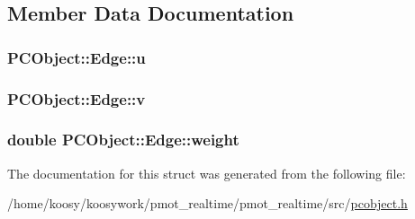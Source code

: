 \subsection{\-Member \-Data \-Documentation}
\hypertarget{struct_p_c_object_1_1_edge_af4067d329722069784adbc2e4df9fc73}{
\subsubsection[{u}]{ {\bf \-P\-C\-Object\-::\-Edge\-::u}}}\label{struct_p_c_object_1_1_edge_af4067d329722069784adbc2e4df9fc73}
\hypertarget{struct_p_c_object_1_1_edge_aaf9714de2de62884dfb6b682f54896f9}{
\subsubsection[{v}]{ {\bf \-P\-C\-Object\-::\-Edge\-::v}}}\label{struct_p_c_object_1_1_edge_aaf9714de2de62884dfb6b682f54896f9}
\hypertarget{struct_p_c_object_1_1_edge_a5f7ec9c43abe68d31fb305b8344a2e5b}{
\subsubsection[{weight}]{\setlength{\rightskip}{0pt plus 5cm}double {\bf \-P\-C\-Object\-::\-Edge\-::weight}}}\label{struct_p_c_object_1_1_edge_a5f7ec9c43abe68d31fb305b8344a2e5b}


\-The documentation for this struct was generated from the following file\-:\begin{DoxyCompactItemize}
\item 
/home/koosy/koosywork/pmot\-\_\-realtime/pmot\-\_\-realtime/src/\hyperlink{pcobject_8h}{pcobject.\-h}\end{DoxyCompactItemize}
